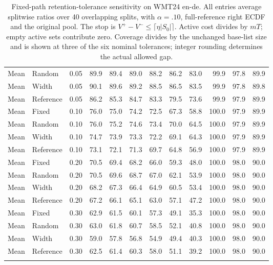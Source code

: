 \begin{table}[t]
\begin{tabular}{llrrrrrrrrrr}
Mean & Random & 0.05 & 89.9 & 89.4 & 89.0 & 88.2 & 86.2 & 83.0 & 99.9 & 97.8 & 89.9 \\
Mean & Width & 0.05 & 90.1 & 89.6 & 89.2 & 88.5 & 86.5 & 83.5 & 99.9 & 97.8 & 89.8 \\
Mean & Reference & 0.05 & 86.2 & 85.3 & 84.7 & 83.3 & 79.5 & 73.6 & 99.9 & 97.9 & 89.9 \\
\addlinespace
Mean & Fixed & 0.10 & 76.0 & 75.0 & 74.2 & 72.5 & 67.3 & 58.8 & 100.0 & 97.9 & 89.9 \\
Mean & Random & 0.10 & 76.0 & 75.2 & 74.6 & 73.4 & 70.0 & 64.5 & 100.0 & 97.9 & 89.9 \\
Mean & Width & 0.10 & 74.7 & 73.9 & 73.3 & 72.2 & 69.1 & 64.3 & 100.0 & 97.9 & 89.9 \\
Mean & Reference & 0.10 & 73.1 & 72.1 & 71.3 & 69.7 & 64.8 & 56.9 & 100.0 & 97.9 & 89.9 \\
\addlinespace
Mean & Fixed & 0.20 & 70.5 & 69.4 & 68.2 & 66.0 & 59.3 & 48.0 & 100.0 & 98.0 & 90.0 \\
Mean & Random & 0.20 & 70.5 & 69.6 & 68.7 & 67.0 & 62.1 & 53.9 & 100.0 & 98.0 & 90.0 \\
Mean & Width & 0.20 & 68.2 & 67.3 & 66.4 & 64.9 & 60.5 & 53.4 & 100.0 & 98.0 & 90.0 \\
Mean & Reference & 0.20 & 67.2 & 66.1 & 65.1 & 63.0 & 57.1 & 47.2 & 100.0 & 98.0 & 90.0 \\
\addlinespace
Mean & Fixed & 0.30 & 62.9 & 61.5 & 60.1 & 57.3 & 49.1 & 35.3 & 100.0 & 98.0 & 90.0 \\
Mean & Random & 0.30 & 63.0 & 61.8 & 60.7 & 58.5 & 52.1 & 40.8 & 100.0 & 98.0 & 90.0 \\
Mean & Width & 0.30 & 59.0 & 57.8 & 56.8 & 54.9 & 49.4 & 40.3 & 100.0 & 98.0 & 90.0 \\
Mean & Reference & 0.30 & 62.5 & 61.4 & 60.3 & 58.0 & 51.1 & 39.2 & 100.0 & 98.0 & 90.0 \\
\addlinespace
\bottomrule
\end{tabular}
\caption{Fixed-path retention-tolerance sensitivity on WMT24 en-de. All entries average splitwise ratios over 40 overlapping splits, with $\alpha=.10$, full-reference right ECDF and the original pool. The stop is $V^+-V^-\le\lceil\eta|S_0|\rceil$. Active cost divides by $mT$; empty active sets contribute zero. Coverage divides by the unchanged base-list size and is shown at three of the six nominal tolerances; integer rounding determines the actual allowed gap.}
\label{tab:tolerance-all-3}
\end{table}

